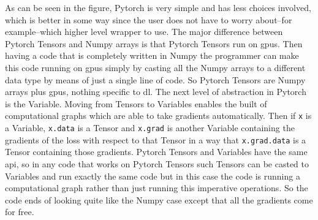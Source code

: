 \documentclass[11pt,a4paper]{article}
\begin{document}
As can be seen in the figure, Pytorch is very simple and has less choices involved, which is better in some way since the user does not have to worry about--for example--which higher level wrapper to use. The major difference between Pytorch Tensors and Numpy arrays is that Pytorch Tensors run on \glspl{gpu}. Then having a code that is completely written in Numpy the programmer can make this code running on \glspl{gpu} simply by casting all the Numpy arrays to a different data type by means of just a single line of code. So Pytorch Tensors are Numpy arrays plus \glspl{gpu}, nothing specific to \gls{dl}. The next level of abstraction in Pytorch is the Variable. Moving from Tensors to Variables enables the built of computational graphs which are able to take gradients automatically. Then if \texttt{x} is a Variable, \texttt{x.data} is a Tensor and \texttt{x.grad} is another Variable containing the gradients of the loss with respect to that Tensor in a way that \texttt{x.grad.data} is a Tensor containing those gradients. Pytorch Tensors and Variables have the same \gls{api}, so in any code that works on Pytorch Tensors such Tensors can be casted to Variables and run exactly the same code but in this case the code is running a computational graph rather than just running this imperative operations. So the code ends of looking quite like the Numpy case except that all the gradients come for free.
\end{document}
